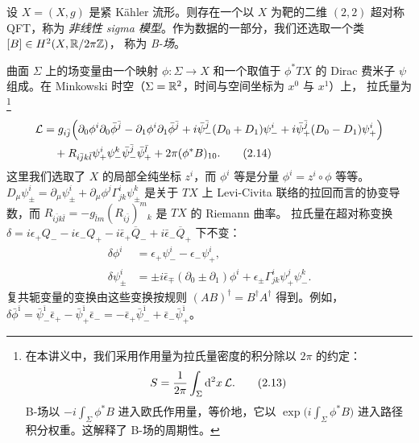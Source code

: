 
设 $X=(X,g)$ 是紧 Kähler 流形。则存在一个以 $X$ 为靶的二维 $(2,2)$ 超对称 QFT，称为
\emph{非线性 sigma 模型}。作为数据的一部分，我们还选取一个类 $[B]\in H^2(X,\mathbb{R}/2\pi\mathbb{Z})$，
称为 \emph{B-场}。

曲面 $\Sigma$ 上的场变量由一个映射 $\phi:\Sigma\to X$ 和一个取值于 $\phi^*TX$ 的 Dirac 费米子
$\psi$ 组成。在 Minkowski 时空（$\Sigma=\mathbb{R}^2$，时间与空间坐标为 $x^0$ 与 $x^1$）上，
拉氏量为\footnote{在本讲义中，我们采用作用量为拉氏量密度的积分除以 $2\pi$ 的约定：
\begin{equation}
  S=\frac{1}{2\pi}\int_\Sigma \mathrm{d}^2x\,\mathcal{L}. \tag{2.13}
\end{equation}
B-场以 $-i\int_\Sigma \phi^*B$ 进入欧氏作用量，等价地，它以 $\exp\big(i\int_\Sigma\phi^*B\big)$
进入路径积分权重。这解释了 B-场的周期性。}
\begin{align}
  \mathcal{L} &= g_{i\bar j}\Big(\partial_0\phi^i\partial_0\bar\phi^{\bar j}-\partial_1\phi^i\partial_1\bar\phi^{\bar j}
   +i\bar\psi^{\bar j}_-(D_0+D_1)\psi^i_-+i\bar\psi^{\bar j}_+(D_0-D_1)\psi^i_+\Big)\notag\\
  &\quad +R_{i\bar j k\bar l}\psi^i_+\psi^k_-\bar\psi^{\bar j}_-\bar\psi^{\bar l}_+ + 2\pi(\phi^*B)_{10}. \tag{2.14}
\end{align}
这里我们选取了 $X$ 的局部全纯坐标 $z^i$，而 $\phi^i$ 等是分量 $\phi^i=z^i\circ\phi$ 等等。
$D_\mu\psi^i_\pm=\partial_\mu\psi^i_\pm+\partial_\mu\phi^j\Gamma^i_{jk}\psi^k_\pm$ 是关于 $TX$ 上
Levi-Civita 联络的拉回而言的协变导数，而
$R_{i\bar jk\bar l}=-g_{\bar l m}(R_{i\bar j})^{m}{}_{k}$ 是 $TX$ 的 Riemann 曲率。
拉氏量在超对称变换
$\delta=i\epsilon_+Q_- - i\epsilon_-Q_+ - i\bar\epsilon_+\overline Q_- + i\bar\epsilon_-\overline Q_+$ 下不变：
\begin{align}
  \delta\phi^i &= \epsilon_+\psi^i_--\epsilon_-\psi^i_+, \tag{2.15}\\
  \delta\psi^i_\pm &= \pm i\bar\epsilon_\mp(\partial_0\pm\partial_1)\phi^i+\epsilon_\pm\Gamma^i_{jk}\psi^j_+\psi^k_-. \tag{2.16}
\end{align}
复共轭变量的变换由这些变换按规则 $(AB)^\dagger=B^\dagger A^\dagger$ 得到。例如，
$\delta\bar\phi^{\bar\imath}=\bar\psi^{\bar\imath}_-\bar\epsilon_+-\bar\psi^{\bar\imath}_+\bar\epsilon_-=-\bar\epsilon_+\bar\psi^{\bar\imath}_-+\bar\epsilon_-\bar\psi^{\bar\imath}_+$。

